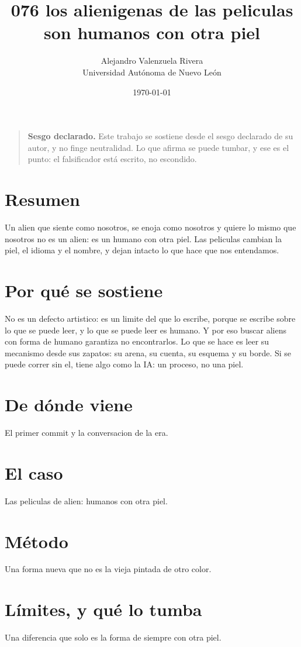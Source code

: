 \documentclass[11pt,a4paper]{article}
\title{076 los alienigenas de las peliculas son humanos con otra piel}
\author{Alejandro Valenzuela Rivera\\\small Universidad Autónoma de Nuevo León}
\date{\today}
\begin{document}
\maketitle

\begin{quote}
\textbf{Sesgo declarado.} Este trabajo se sostiene desde el sesgo declarado de su autor, y no finge neutralidad. Lo que afirma se puede tumbar, y ese es el punto: el falsificador está escrito, no escondido.
\end{quote}

\section*{Resumen}
Un alien que siente como nosotros, se enoja como nosotros y quiere lo mismo que nosotros no es un alien: es un humano con otra piel. Las peliculas cambian la piel, el idioma y el nombre, y dejan intacto lo que hace que nos entendamos.

\section{Por qué se sostiene}
No es un defecto artistico: es un limite del que lo escribe, porque se escribe sobre lo que se puede leer, y lo que se puede leer es humano. Y por eso buscar aliens con forma de humano garantiza no encontrarlos. Lo que se hace es leer su mecanismo desde sus zapatos: su arena, su cuenta, su esquema y su borde. Si se puede correr sin el, tiene algo como la IA: un proceso, no una piel.

\section{De dónde viene}
El primer commit y la conversacion de la era.

\section{El caso}
Las peliculas de alien: humanos con otra piel.

\section{Método}
Una forma nueva que no es la vieja pintada de otro color.

\section{Límites, y qué lo tumba}
Una diferencia que solo es la forma de siempre con otra piel.
\end{document}
